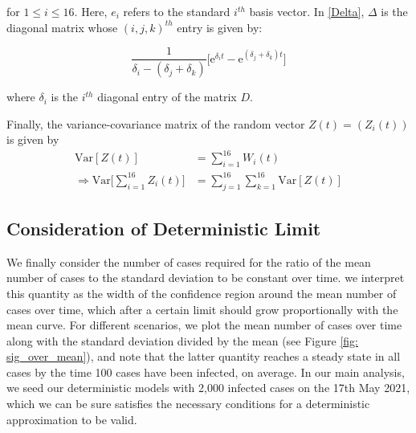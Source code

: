 \documentclass{article}
\begin{document}
for $1 \leq i \leq 16$. Here, $e_i$ refers to the standard $i^{th}$ basis vector. In \ref{Delta}, $\Delta$ is the diagonal matrix whose $(i, j, k)^{th}$ entry is given by:

\begin{equation}
\frac{1}{\delta_i - (\delta_j + \delta_k)}\big[{\mathrm{e}}^{\delta_i t} - {\mathrm{e}}^{(\delta_j + \delta_k) t}\big] 
\end{equation}

where $\delta_i$ is the $i^{th}$ diagonal entry of the matrix $D$. 

Finally, the variance-covariance matrix of the random vector $Z(t) = (Z_i(t))$ is given by 
\begin{align}
{\text{Var}}[Z(t)] &= \sum_{i=1}^{16} W_i(t) \\
\Rightarrow {\text{Var}} \Big[\sum_{i=1}^{16} Z_i(t)\Big] &= \sum_{j=1}^{16} \sum_{k=1}^{16} {\text{Var}}[Z(t)] \label{variance}
\end{align}

\subsection{Consideration of Deterministic Limit}

We finally consider the number of cases required for the ratio of the mean number of cases to the standard deviation to be constant over time. we interpret this quantity as the width of the confidence region around the mean number of cases over time, which after a certain limit should grow proportionally with the mean curve. For different scenarios, we plot the mean number of cases over time along with the standard deviation divided by the mean (see Figure \ref{fig: sig_over_mean}), and note that the latter quantity reaches a steady state in all cases by the time 100 cases have been infected, on average. In our main analysis, we seed our deterministic models with 2,000 infected cases on the 17th May 2021, which we can be sure satisfies the necessary conditions for a deterministic approximation to be valid. 
\end{document}
